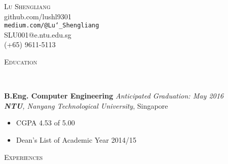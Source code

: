 \documentclass[a4paper, 12pt]{article}
\newenvironment{changemargin}[2]{%
  \begin{list}{}{%
      \setlength{\topsep}{0pt}%
      \setlength{\leftmargin}{#1}%
      \setlength{\rightmargin}{#2}%
      \setlength{\listparindent}{\parindent}%
      \setlength{\itemindent}{\parindent}%
      \setlength{\parsep}{\parskip}%
    }%
  \item[]}{\end{list}
}
\newcommand{\lineover}{
  \begin{changemargin}{-0.05in}{-0.05in}
    \vspace*{-8pt}
    \hrulefill \\
    \vspace*{-2pt}
  \end{changemargin}
}
\newcommand{\header}[1]{
  \begin{changemargin}{-0.5in}{-0.5in}
    \scshape{#1}\\
    \lineover
  \end{changemargin}
}
\newcommand{\contact}[5]{
  \begin{changemargin}{-0.5in}{-0.5in}
    \begin{center}
      {\LARGE \scshape {#1}}\\ \smallskip
      {#2}\\ \smallskip
      {#3}\\ \smallskip
      {#4}\\ \smallskip
      {#5}   \smallskip
    \end{center}
  \end{changemargin}
}
\newenvironment{body}
{
\vspace*{-16pt}
\begin{changemargin}{-0.25in}{-0.5in}
}	
{
\end{changemargin}
}
\begin{document}
\contact{Lu Shengliang}{github.com/lushl9301}{\texttt{medium.com/@Lu\char`_Shengliang}}{SLU001@e.ntu.edu.sg}{(+65) 9611-5113}





\header{Education}

\begin{body}
  \vspace{14pt}
  \textbf{B.Eng. Computer Engineering} \hfill \emph{Anticipated Graduation: May 2016} \\
  \emph{\textbf{NTU}, Nanyang Technological University}, Singapore\\
  \begin{itemize} \itemsep -0pt  \small
  \item CGPA 4.53 of 5.00
  \item Dean's List of Academic Year 2014/15
  \end{itemize} 
\end{body}


\smallskip
\medskip
\header{Experiences}
\end{document}
